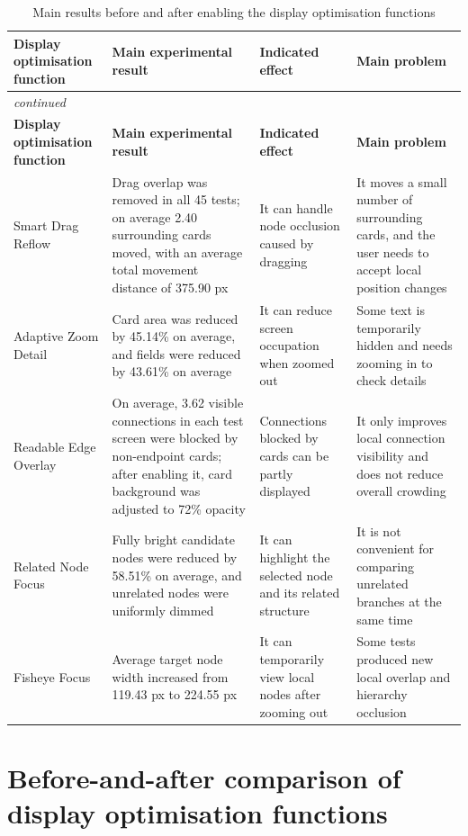 \begin{center}

\begin{longtable}{@{}p{} p{} p{} p{}@{}}
\caption{Main results before and after enabling the display optimisation functions}\label{tab:display-main-results}\\
\toprule
\textbf{Display optimisation function} & \textbf{Main experimental result} & \textbf{Indicated effect} & \textbf{Main problem} \\
\midrule
\endfirsthead
\multicolumn{4}{l}{\itshape continued}\\
\toprule
\textbf{Display optimisation function} & \textbf{Main experimental result} & \textbf{Indicated effect} & \textbf{Main problem} \\
\midrule
\endhead
Smart Drag Reflow & Drag overlap was removed in all 45 tests; on average 2.40 surrounding cards moved, with an average total movement distance of 375.90 px & It can handle node occlusion caused by dragging & It moves a small number of surrounding cards, and the user needs to accept local position changes \\
Adaptive Zoom Detail & Card area was reduced by 45.14\% on average, and fields were reduced by 43.61\% on average & It can reduce screen occupation when zoomed out & Some text is temporarily hidden and needs zooming in to check details \\
Readable Edge Overlay & On average, 3.62 visible connections in each test screen were blocked by non-endpoint cards; after enabling it, card background was adjusted to 72\% opacity & Connections blocked by cards can be partly displayed & It only improves local connection visibility and does not reduce overall crowding \\
Related Node Focus & Fully bright candidate nodes were reduced by 58.51\% on average, and unrelated nodes were uniformly dimmed & It can highlight the selected node and its related structure & It is not convenient for comparing unrelated branches at the same time \\
Fisheye Focus & Average target node width increased from 119.43 px to 224.55 px & It can temporarily view local nodes after zooming out & Some tests produced new local overlap and hierarchy occlusion \\
\bottomrule
\end{longtable}
\end{center}

\section{Before-and-after comparison of display optimisation functions}

